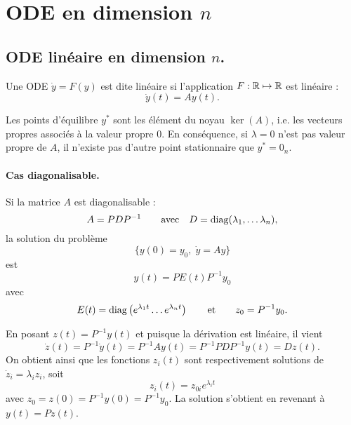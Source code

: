 \section{ODE en dimension $n$} \label{sec:EquaDiff-nonLineaire}

\subsection{ODE linéaire en dimension $n$.}

\begin{definition}
  Une ODE $\dot y = F(y)$ est dite linéaire si l'application $F : \mathbb{R} \mapsto \mathbb{R}$ est linéaire : 
  $$
  \dot y (t) = A y(t).
  $$
\end{definition}

\remark
Les points d'équilibre $y^*$ sont les élément du noyau $\ker(A)$, i.e. les vecteurs propres associés à la valeur propre 0. En conséquence, si $\lambda = 0$ n'est pas valeur propre de $A$, il n'existe pas d'autre point stationnaire que $y^* = 0_n$.

\paragraph*{Cas diagonalisable.}

\begin{proposition} \label{prop:odeLineaireDiagonalisable}
  Si la matrice $A$ est diagonalisable : 
  $$
  A = P D P^{-1}
  \qquad \text{avec}  \quad 
  D = \operatorname{diag}(\lambda_1, \dots \lambda_n),
  $$
  la solution du problème
  $$
  \{y(0) = y_0, \; \dot y = A y\}
  $$
  est
  $$
  y(t) = P E(t) P^{-1} y_0  
  $$
  avec
  $$
  E(t) = \operatorname{diag}\left(e^{\lambda_1 t} \dots e^{\lambda_n t} \right)
  \qquad \text{et} \qquad
  z_0 = P^{-1} y_0.
  $$
\end{proposition}

\proof
En posant $z(t) = P^{-1} y(t)$ et puisque la dérivation est linéaire, il vient 
$$
\dot z (t) = P^{-1} \dot y(t) = P^{-1} A y(t) = P^{-1} P D P^{-1} y(t) = D z(t).
$$
On obtient ainsi que les fonctions $z_i(t)$ sont respectivement solutions de $\dot z_i = \lambda_i z_i$, soit 
$$
z_i(t) = z_{0i} e^{\lambda_i t}
$$
avec $z_0 = z(0) = P^{-1} y(0) = P^{-1} y_0$. La solution s'obtient en revenant à $y(t) = P z(t)$.
\eproof

